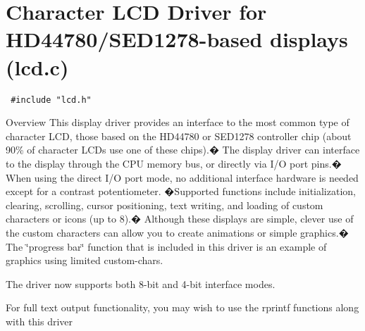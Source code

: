 \hypertarget{group__lcd}{
\section{Character LCD Driver for HD44780/SED1278-based displays (lcd.c)}
\label{group__lcd}
}


\begin{Code}\begin{verbatim} #include "lcd.h" 
\end{verbatim}
\end{Code}

 \begin{Desc}
\item[Overview]This display driver provides an interface to the most common type of character LCD, those based on the HD44780 or SED1278 controller chip (about 90\% of character LCDs use one of these chips).� The display driver can interface to the display through the CPU memory bus, or directly via I/O port pins.� When using the direct I/O port mode, no additional interface hardware is needed except for a contrast potentiometer. �Supported functions include initialization, clearing, scrolling, cursor positioning, text writing, and loading of custom characters or icons (up to 8).� Although these displays are simple, clever use of the custom characters can allow you to create animations or simple graphics.� The \char`\"{}progress bar\char`\"{} function that is included in this driver is an example of graphics using limited custom-chars.\end{Desc}
The driver now supports both 8-bit and 4-bit interface modes.

For full text output functionality, you may wish to use the rprintf functions along with this driver 